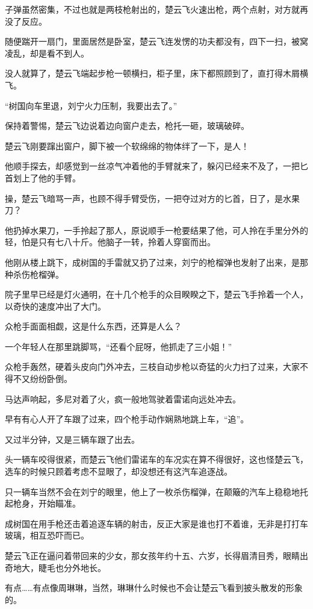子弹虽然密集，不过也就是两枝枪射出的，楚云飞火速出枪，两个点射，对方就再没了反应。

随便踹开一扇门，里面居然是卧室，楚云飞连发愣的功夫都没有，四下一扫，被窝凌乱，却是看不到人。

没人就算了，楚云飞端起步枪一顿横扫，柜子里，床下都照顾到了，直打得木屑横飞。

“树国向车里退，刘宁火力压制，我要出去了。”

保持着警惕，楚云飞边说着边向窗户走去，枪托一砸，玻璃破碎。

楚云飞刚要蹿出窗户，脚下被一个软绵绵的物体绊了一下，是人！

他顺手探去，却感觉到一丝凉气冲着他的手臂就来了，躲闪已经来不及了，一把匕首划上了他的手臂。

操，楚云飞暗骂一声，也顾不得手臂受伤，一把夺过对方的匕首，日了，是水果刀？

他扔掉水果刀，一手拎起了那人，原说顺手一枪要结果了他，可人拎在手里分外的轻，怕是只有七八十斤。他脑子一转，拎着人穿窗而出。

他刚从楼上跳下，成树国的手雷就又扔了过来，刘宁的枪榴弹也发射了出来，是那种杀伤枪榴弹。

院子里早已经是灯火通明，在十几个枪手的众目睽睽之下，楚云飞手拎着一个人，以奇快的速度冲出了大门。

众枪手面面相觑，这是什么东西，还算是人么？

一个年轻人在那里跳脚骂，“还看个屁呀，他抓走了三小姐！”

众枪手轰然，硬着头皮向门外冲去，三枝自动步枪以奇猛的火力扫了过来，大家不得不又纷纷卧倒。

马达声响起，多尼对着了火，疯一般地驾驶着雷诺向远处冲去。

早有有心人开了车跟了过来，四个枪手动作娴熟地跳上车，“追”。

又过半分钟，又是三辆车跟了出去。

头一辆车咬得很紧，而楚云飞他们雷诺车的车况实在算不得很好，这也怪楚云飞，选车的时候只顾着考虑不显眼了，却没想还有这汽车追逐战。

只一辆车当然不会在刘宁的眼里，他上了一枚杀伤榴弹，在颠簸的汽车上稳稳地托起枪身，开始瞄准。

成树国在用手枪还击着追逐车辆的射击，反正大家是谁也打不着谁，无非是打打车玻璃，相互恐吓而已。

楚云飞正在逼问着带回来的少女，那女孩年约十五、六岁，长得眉清目秀，眼睛出奇地大，睫毛也分外地长。

有点……有点像周琳琳，当然，琳琳什么时候也不会让楚云飞看到披头散发的形象的。

